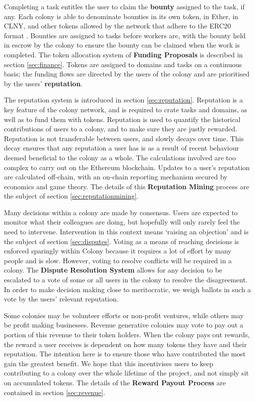 Completing a task entitles the user to claim the \textbf{bounty} assigned to the task, if any. Each colony is able to denominate bounties in its own token, in Ether, in CLNY, and other tokens allowed by the network that adhere to the ERC20 format \cite{erc20}. Bounties are assigned to tasks before workers are, with the bounty held in escrow by the colony to ensure the bounty can be claimed when the work is completed. The token allocation system of \textbf{Funding Proposals} is described in section \ref{sec:finance}. Tokens are assigned to domains and tasks on a continuous basis; the funding flows are directed by the users of the colony and are prioritised by the users' \textbf{reputation}. 

The reputation system is introduced in section \ref{sec:reputation}. Reputation is a key feature of the colony network, and is required to crate tasks and domains, as well as to fund them with tokens. Reputation is used to quantify the historical contributions of users to a colony, and to make sure they are justly rewarded. Reputation is not transferable between users, and slowly decays over time. This decay ensures that any reputation a user has is as a result of recent behaviour deemed beneficial to the colony as a whole. The calculations involved are too complex to carry out on the Ethereum blockchain. Updates to a user's reputation are calculated off-chain, with an on-chain reporting mechanism secured by economics and game theory. The details of this \textbf{Reputation Mining} process are the subject of section \ref{sec:reputationmining}.

Many decisions within a colony are made by consensus. Users are expected to monitor what their colleagues are doing, but hopefully will only rarely feel the need to intervene. Intervention in this context means `raising an objection' and is the subject of section \ref{sec:disputes}. Voting as a means of reaching decisions is enforced sparingly within Colony because it requires a lot of effort by many people and is slow. However, voting to resolve conflicts will be required in a colony. The \textbf{Dispute Resolution System} allows for any decision to be escalated to a vote of some or all users in the colony to resolve the disagreement. In order to make decision making close to meritocratic, we weigh ballots in such a vote by the users' relevant reputation.

Some colonies may be volunteer efforts or non-profit ventures, while others may be profit making businesses. Revenue generative colonies may vote to pay out a portion of this revenue to their token holders. When the colony pays out rewards, the reward a user receives is dependent on how many tokens they have and their reputation. The intention here is to ensure those who have contributed the most gain the greatest benefit. We hope that this incentivises users to keep contributing to a colony over the whole lifetime of the project, and not simply sit on accumulated tokens. The details of the \textbf{Reward Payout Process} are contained in section \ref{sec:revenue}.

